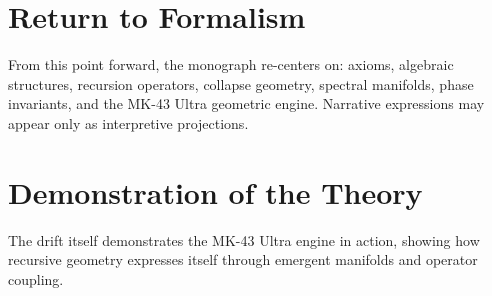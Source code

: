 \section{Return to Formalism}
From this point forward, the monograph re-centers on:
axioms, algebraic structures, recursion operators, collapse geometry, spectral manifolds, phase invariants, and the MK-43 Ultra geometric engine. Narrative expressions may appear only as interpretive projections.

\section{Demonstration of the Theory}
The drift itself demonstrates the MK-43 Ultra engine in action, showing how recursive geometry expresses itself through emergent manifolds and operator coupling.

